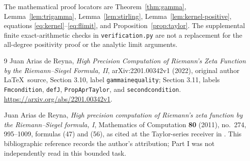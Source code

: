 \documentclass[11pt]{article}
\begin{document}
The mathematical proof locators are
Theorem~\ref{thm:gamma}, Lemma~\ref{lem:trigamma},
Lemma~\ref{lem:stirling}, Lemma~\ref{lem:kernel-positive},
equations \eqref{eq:kernel}--\eqref{eq:flimit}, and
Proposition~\ref{prop:taylor}. The supplemental finite exact-arithmetic
checks in \texttt{verification.py} are not a replacement for the
all-degree positivity proof or the analytic limit arguments.

\begin{thebibliography}{9}
Juan Arias de Reyna,
\emph{High Precision Computation of Riemann's Zeta Function by the
Riemann--Siegel Formula, II}, arXiv:2201.00342v1 (2022), original
author \LaTeX\ source, Section 3.10, label \texttt{gammainequality};
Section 3.11, labels \texttt{Fmcondition}, \texttt{defJ},
\texttt{PropAprTaylor}, and \texttt{secondcondition}.
\url{https://arxiv.org/abs/2201.00342v1}.

Juan Arias de Reyna,
\emph{High precision computation of Riemann's zeta function by the
Riemann--Siegel formula, I}, Mathematics of Computation
\textbf{80} (2011), no.~274, 995--1009, formulas (47) and (56),
as cited at the Taylor-series receiver in \cite{AriasII}.
This bibliographic reference records the author's attribution;
Part I was not independently read in this bounded task.
\end{thebibliography}
\end{document}
